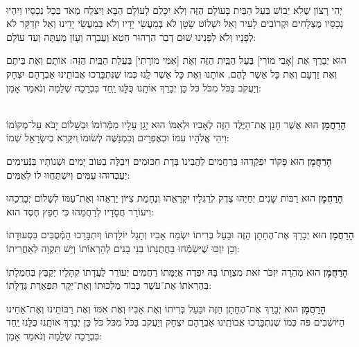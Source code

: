 \documentclass[a4paper, twoside, openany, parskip=half, 10pt]{article}
\begin{document}
\begin{multicols}{3}
\begin{footnotesize}
\\
יְהִי רָצוֹן שֶׁלֹא יֵבוֹשׁ בַּעַל הַבַּיִת בָּעוֹלָם הַזֶּה וְלֹא יִכָּלֵם לָעוֹלָם הַבָּא וְיִצְלַח מְאֹד בְּכָל נְכָסָיו וְיִהְיוּ נְכָסָיו מֻצְלָחִים וּקְרוֹבִים לָעִיר וְאַל יִשְׁלוֹט שָׂטָן לֹא בְּמַעֲשֵׂי יָדָיו וְלֹא בְּמַעֲשֵׂי יָדֵינוּ וְאַל יִזְדַקֵּר לֹא לְפָנָיו וְלֹא לְפָנֵינוּ שׁוּם דְבַר הִרְהוּר חֵטְא וַעֲבֵרָה וְעָוֹן מֵעַתָּה וְעַד עוֹלָם:

\end{footnotesize}
 
 הוּא יְבָרֵךְ אֶת [אָבִי מוֹרִי] בַּעַל הַבַּֽיִת הַזֶּה וְאֶת [אִמִּי מוֹרָתִי] בַּעֲלַת הַבַּֽיִת הַזֶּה: אוֹתָם וְאֶת בֵּיתָם וְאֶת זַרְעָם וְאֶת כָּל אַשֶׁר לָהֶם, אוֹתָנוּ וְאֶת כָּל אַשֶׁר לָֽנוּ כְּמוֹ שֶׁנִּתְבָּרֲכוּ אֲבוֹתֵֽינוּ אַבְרָהָם יִצְחָק וְיַעֲקֹב בַּכֹּל מִכֹּל כֹּל כֵּן יְבָרֵךְ אוֹתָֽנוּ כֻּלָּנוּ יַֽחַד בִּבְרָכָה שְׁלֵמָה וְנֹאמַר אָמֵן:

\begin{sometimes}

\\
	\textbf{הָרַחֲמָן}
	 הוּא אֲשֶׁר חָנַן אֶת־הַיֶּלֶד הַזֶּה לְאָבִיו וּלְאִמּוֹ הוּא יָגֵן עָלָיו מִמְּֿרוֹמוֹ וּבְשָׁלוֹם יָבֹא עַל־מְקוֹמוֹ וִיהִי אֱלֹהָיו עִמּוֹ וּכְאֶפְרַיִם וְכִמְנַשֶּׁה לְשׂוּמוֹ ְויִקָּרֵא בְיִשְׂרָאֵל שְׁמוֹ:
	 
	\textbf{הָרַחֲמָן}
	 הוּא פָּקוֹד יִפְקְֿדֵהוּ בְּרַחֲמִים לַהֲבִינוֹ בְּדָת חִכּוּמִים וִיבַלֶּה בַטּוֹב יָמִים וּשְׁנוֹתָיו בַּנְּֿעִימִים יַעַבְדוּהוּ עַמִּים וְיִשְׁתַּחֲווּ לוֹ לְאֻמִּים: 
	
	\textbf{הָרַחֲמָן}
	 הוּא רַבּוֹת שָׁנִים יְחַיֵּהוּ צֶדֶק לְרַגְלָיו יִקְרָאֵהוּ וְנֶחָמַת צִיּוֹן יַרְאֵהוּ וְאֶת־עַמּוֹ לְשָׁלוֹם יְבָרֲכֵהוּ וִיעוֹרֵר חֲסָדָיו לְרַחֲמֵהוּ כִּי חָפֵץ חֶסֶד הוּא: 
	
	\textbf{הָרַחֲמָן}
	 הוּא יְבָרֵךְ אֶת־הֶחָתָן הַזֶּה וּבַעַל בְּרִיתוֹ יִשְׂמַח אָבִיו וְתָגֵל יוֹלַדְתּוֹ וְיִתְבָּרַכוּ הַמְֿסֻבִּים בִּסְעוּדָתוֹ וְכֵן יִזְכּוּ שֶׁיִּשְׂמְֿחוּ בַּחֲתֻנָּתוֹ בְּנֵי בָנִים לְהַרְאוֹתוֹ וְיֵשׁ תִּקְוָה לְאַחֲרִיתוֹ: 
	
	\textbf{הָרַחֲמָן}
	 הוּא מְהֵרָה יִזְכֹּר זֹאת מִצְוָתוֹ בָּהּ יִפְדֶה אֲיֻמָּתוֹ רַחֲמִים יְעוֹרֵר לַעֲדָתוֹ קְהָלָיו יְקַבֵּץ בְּחֶמְלָתוֹ בְּהַרְאֹתוֹ אֶת־עֹשֶׁר כְּבוֹד מַלְכוּתוֹ וְאֶת־יְקָר תִּפְאֶרֶת גְּדֻלָּתוֹ: 
	
	\textbf{הָרַחֲמָן}
	 הוּא יְבָרֵךְ אֶת־הֶחָתָן הַזֶּה וּבַּעַל בְּרִיתוֹ וְאֶת אָבִיו וְאֶת אִמּוֹ וְאֶת רַבּוֹתֵינוּ וְאֶת־אַחֵינוּ הַיּוֹשְֿׁבִים פֹּה כְּמוֹ שֶׁנִתְבָּרֲכוּ אֲבוֹתֵֽינוּ אַבְרָהָם יִצְחָק וְיַעֲקֹב בַּכֹּל מִכֹּל כֹּל כֵּן יְבָרֵךְ אוֹתָֽנוּ כֻּלָּנוּ יַֽחַד בִּבְרָכָה שְׁלֵמָה וְנֹאמַר אָמֵן:


\end{sometimes}
\end{multicols}
\end{document}
